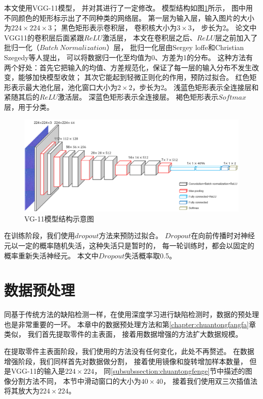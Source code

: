 本文使用VGG-11\cite{simonyan2014very}模型，
并对其进行了一定修改。
模型结构如图\ref{fig:VGG}所示，
图中用不同颜色的矩形标示出了不同种类的网络层。
第一层为输入层，输入图片的大小为$224\times224\times3$；
黑色矩形表示卷积层，
卷积核大小为$3\times3$，
步长为2。
论文中VGG11的卷积层后面紧跟$ReLU$激活层，
本文在卷积层之后、$ReLU$层之前加入了批归一化（$Batch~Normalization$）层，
批归一化层由Sergey loffe和Christian Szegedy等人提出，
可以将数据归一化至均值为0、方差为1的分布。
这种方法有两个好处：首先它把输入的均值、方差规范化，保证了每一层的输入分布不发生改变，能够加快模型收敛；
其次它能起到轻微正则化的作用，预防过拟合。
红色矩形表示最大池化层，池化窗口大小为$2\times2$，步长为2。
浅蓝色矩形表示全连接层和紧随其后的$ReLU$激活层。
深蓝色矩形表示全连接层。
褐色矩形表示$Softmax$层，用于分类。

\begin{figure}[htbp]
\centering
\includegraphics[width=1.0\linewidth]{figures/VGG.png}
\caption{VG-11模型结构示意图}
\label{fig:VGG}
\end{figure}

在训练阶段，我们使用$dropout$方法来预防过拟合。
$Dropout$在向前传播时对神经元以一定的概率随机失活，这种失活只是暂时的，
每一轮训练时，都会以固定的概率重新失活神经元。
本文中$Dropout$失活概率取0.5。


\section{数据预处理}

同基于传统方法的缺陷检测一样，在使用深度学习进行缺陷检测时，数据的预处理也是非常重要的一环。
本章中的数据预处理方法和第\ref{chapter:chuantongfangfa}章类似，
我们首先提取零件的主表面，
接着用数据增强的方法扩大数据规模。

在提取零件主表面阶段，我们使用的方法没有任何变化，此处不再赘述。
在数据增强阶段，我们同样首先对数据做分割，
接着使用镜像和旋转增加样本数量，
但是VGG-11的输入是$224\times 224$，
同\ref{subsubssection:chuantongfenge}节中描述的图像分割方法不同，
本节中滑动窗口的大小为$40\times 40$，
接着我们使用双三次插值法将其放大为$224\times 224$。


